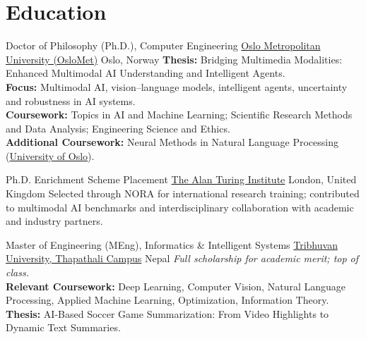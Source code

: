 \documentclass[11pt,a4paper,sans]{moderncv}
\begin{document}


\section{Education}

{Doctor of Philosophy (Ph.D.), Computer Engineering}
{\href{https://www.oslomet.no/en}{Oslo Metropolitan University (OsloMet)}}
{Oslo, Norway}
{}
{
\textbf{Thesis:} Bridging Multimedia Modalities: Enhanced Multimodal AI Understanding and Intelligent Agents.\\
\textbf{Focus:} Multimodal AI, vision--language models, intelligent agents, uncertainty and robustness in AI systems.\\
\textbf{Coursework:} Topics in AI and Machine Learning; Scientific Research Methods and Data Analysis; Engineering Science and Ethics.\\
\textbf{Additional Coursework:} Neural Methods in Natural Language Processing (\href{https://www.uio.no/}{University of Oslo}).
}

{Ph.D. Enrichment Scheme Placement}
{\href{https://www.turing.ac.uk/}{The Alan Turing Institute}}
{London, United Kingdom}
{}
{
Selected through NORA for international research training; contributed to multimodal AI benchmarks and interdisciplinary collaboration with academic and industry partners.
}

{Master of Engineering (MEng), Informatics \& Intelligent Systems}
{\href{https://tcioe.edu.np/}{Tribhuvan University, Thapathali Campus}}
{Nepal}
{}
{
\textit{Full scholarship for academic merit; top of class.}\\
\textbf{Relevant Coursework:} Deep Learning, Computer Vision, Natural Language Processing, Applied Machine Learning, Optimization, Information Theory.\\
\textbf{Thesis:} AI-Based Soccer Game Summarization: From Video Highlights to Dynamic Text Summaries.
}
\end{document}
